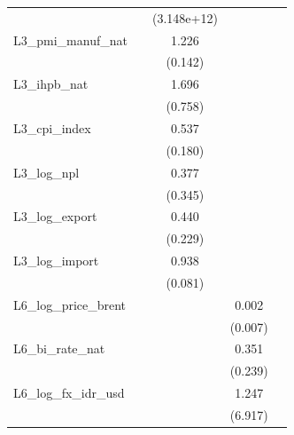 {\begin{tabular}{l*{4}{c}}
                &                  &(3.148e+12)         &                  &                  \\
\addlinespace
L3\_pmi\_manuf\_nat&                  &    1.226\sym{*}  &                  &                  \\
                &                  &  (0.142)         &                  &                  \\
\addlinespace
L3\_ihpb\_nat     &                  &    1.696         &                  &                  \\
                &                  &  (0.758)         &                  &                  \\
\addlinespace
L3\_cpi\_index    &                  &    0.537\sym{*}  &                  &                  \\
                &                  &  (0.180)         &                  &                  \\
\addlinespace
L3\_log\_npl      &                  &    0.377         &                  &                  \\
                &                  &  (0.345)         &                  &                  \\
\addlinespace
L3\_log\_export   &                  &    0.440         &                  &                  \\
                &                  &  (0.229)         &                  &                  \\
\addlinespace
L3\_log\_import   &                  &    0.938         &                  &                  \\
                &                  &  (0.081)         &                  &                  \\
\addlinespace
L6\_log\_price\_brent&                  &                  &    0.002         &                  \\
                &                  &                  &  (0.007)         &                  \\
\addlinespace
L6\_bi\_rate\_nat  &                  &                  &    0.351         &                  \\
                &                  &                  &  (0.239)         &                  \\
\addlinespace
L6\_log\_fx\_idr\_usd&                  &                  &    1.247         &                  \\
                &                  &                  &  (6.917)         &                  \\

\end{tabular}}
